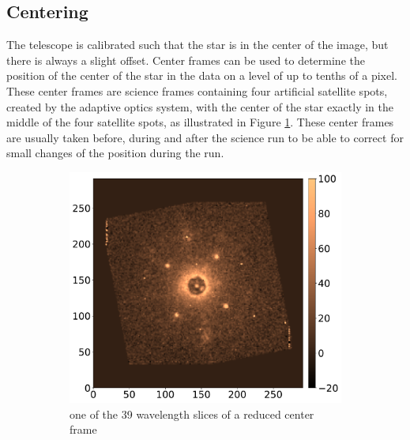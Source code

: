 \documentclass[twoside,single,12pt]{lion-msc}
\begin{document}
\subsection{Centering}
The telescope is calibrated such that the star is in the center of the image, but there is always a slight offset. Center frames can be used to determine the position of the center of the star in the data on a level of up to tenths of a pixel. These center frames are science frames containing four artificial satellite spots, created by the adaptive optics system, with the center of the star exactly in the middle of the four satellite spots, as illustrated in Figure \ref{fig:centerframe}. These center frames are usually taken before, during and after the science run to be able to correct for small changes of the position during the run.
\begin{figure}[!t]
\centering
\begin{subfigure}{.48\textwidth}
  \centering
  \includegraphics[width=1\linewidth]{centerframe}
  \caption{one of the 39 wavelength slices of a reduced center frame}
  \label{fig:centerframe}
\end{subfigure}\hfill
\begin{subfigure}{.48\textwidth}
  \centering

\end{subfigure}
\end{figure}
\end{document}

